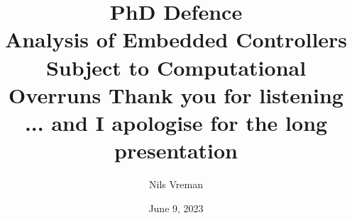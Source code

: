\documentclass[aspectratio=169]{beamer}
\title[PhD Defence]{%
    {\Huge PhD Defence}\\[0.5cm]
    {\Large Analysis of Embedded Controllers\\ Subject to Computational Overruns}
}
\author[Nils Vreman]{%
    \vspace{0.25cm}
    \LARGE Nils Vreman
}
\date[June 9]{%
    \vspace{5mm}
    June 9, 2023
}
\begin{document}
 
\logooff{}













\title[PhD Defence]{%
    {\Huge Thank you for listening}\\
    {\tiny ... and I apologise for the long presentation}
}
\author[Nils Vreman]{}
\date[]{}
\notitlelogo{}


\extraframesbegin{}




\extraframesend{}
\logoon{}
\end{document}
